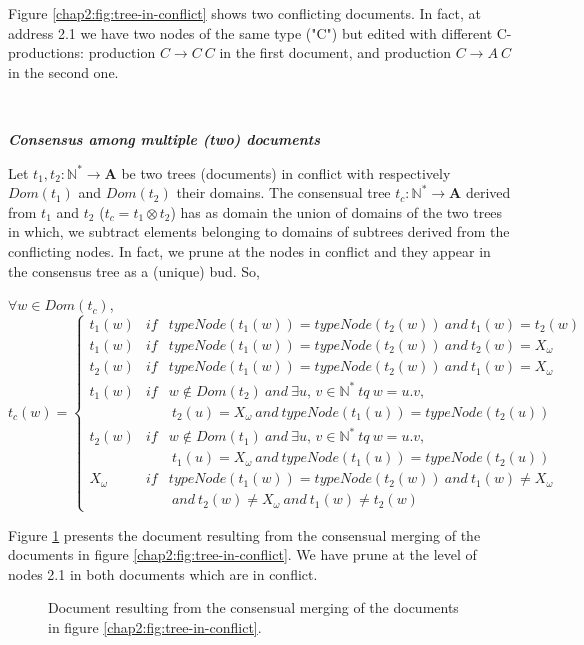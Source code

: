 Figure \ref{chap2:fig:tree-in-conflict} shows two conflicting documents. In fact, at address 2.1 we have two nodes of the same type ("C") but edited with different C-productions:  production $C \rightarrow C ~C $ in the first document, and production $C \rightarrow A~C $ in the second one.

~

\noindent\textbf{\textit{Consensus among multiple (two) documents}}

Let $t_1,t_2:\mathbb{N}^*\rightarrow \mathbf{A}$ be two trees (documents) in conflict with respectively $\mathit{Dom}(t_1)$ and $\mathit{Dom}(t_2)$ their domains.
The consensual tree $t_c:\mathbb{N}^*\rightarrow \mathbf{A}$ derived from $t_1$ and $t_2$ ($t_c = t_1 \otimes t_2$) has as domain the union of domains of the two trees in which, we subtract elements belonging to domains of subtrees derived from the conflicting nodes. In fact, we prune at the nodes in conflict and they appear in the consensus tree as a (unique) bud.
So, 
\begin{center}
$\forall w \in \mathit{Dom}(t_c)$, 
			$ t_c(w) =   
		    \left\{ \begin{array}{lll}
										t_1(w) & \mathit{if} & typeNode(t_1(w)) = typeNode(t_2(w)) ~and ~ t_1(w)=t_2(w)\\
										t_1(w) & \mathit{if} & typeNode(t_1(w)) = typeNode(t_2(w)) ~and ~ t_2 (w) = X_\omega \\
										t_2 (w) & \mathit{if} & typeNode(t_1(w)) = typeNode(t_2(w)) ~and ~ t_1(w) = X_\omega \\
										t_1(w) & \mathit{if} & w \notin Dom(t_2) ~and~ \exists u,\,v \in \mathbb{N}^* ~ tq ~ w=u.v, \\
														&							& ~ t_2 (u) = X_\omega ~and ~typeNode(t_1(u)) = typeNode(t_2(u))  \\
										t_2(w) & \mathit{if} & w \notin Dom(t_1) ~and~ \exists u,\,v \in \mathbb{N}^* ~ tq ~ w=u.v, \\
														&							&~ t_1(u) = X_\omega ~and~typeNode(t_1(u)) = typeNode(t_2(u))  \\
										X_\omega & \mathit{if} & typeNode(t_1(w)) = typeNode(t_2(w)) ~and ~ t_1(w) \neq X_\omega\\
															&							&~and~ t_2 (w) \neq X_\omega ~and~ t_1(w) \neq t_2(w)  										
									\end{array}
								\right.
  $  
\end{center}

Figure \ref{chap2:fig:consensus-documents} presents the document resulting from the consensual merging of the documents in figure \ref{chap2:fig:tree-in-conflict}. We have prune at the level of nodes 2.1  in both documents which are in conflict.
\begin{figure}[ht!]
	\noindent
	\caption{Document resulting from the consensual merging of the documents in figure \ref{chap2:fig:tree-in-conflict}.}
	\label{chap2:fig:consensus-documents}
\end{figure}

